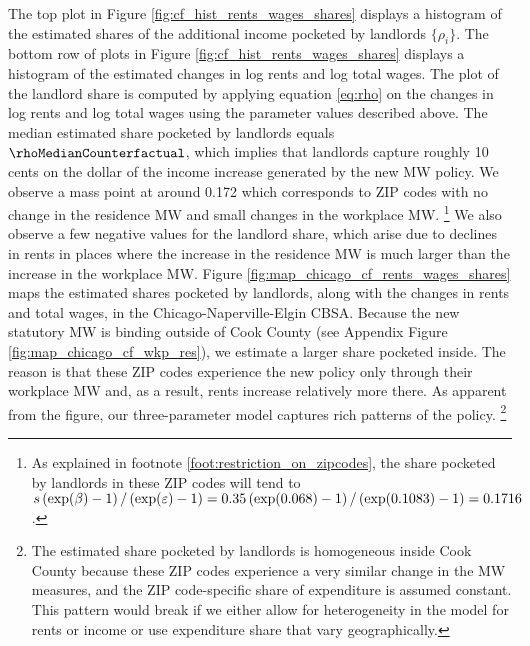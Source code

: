 The top plot in Figure \ref{fig:cf_hist_rents_wages_shares} displays a histogram 
of the estimated shares of the additional income pocketed by landlords 
$\{\rho_i\}$.
The bottom row of plots in Figure \ref{fig:cf_hist_rents_wages_shares} displays 
a histogram of the estimated changes in log rents and log total wages.
The plot of the landlord share is computed by applying equation \eqref{eq:rho} 
on the changes in log rents and log total wages using the parameter values
described above.
The median estimated share pocketed by landlords equals $\rhoMedianCounterfactual$, which implies 
that landlords capture roughly 10 cents on the dollar of the income increase 
generated by the new MW policy.
We observe a mass point at around 0.172 which corresponds to ZIP codes with
no change in the residence MW and small changes in the workplace MW.%
\footnote{As explained in footnote \ref{foot:restriction_on_zipcodes}, the 
share pocketed by landlords in these ZIP codes will tend to
$s \left(\exp(\beta)-1\right)/\left(\exp(\varepsilon)-1\right) 
= 0.35 \left(\exp(\textnormal{0.068})-1\right)/
     \left(\exp(0.1083)-1\right)
= 0.1716$.}
We also observe a few negative values for the landlord share, which
arise due to declines in rents in places where the increase in the residence MW
is much larger than the increase in the workplace MW.
Figure \ref{fig:map_chicago_cf_rents_wages_shares} maps the estimated shares 
pocketed by landlords, along with the changes in rents and total wages, in the 
Chicago-Naperville-Elgin CBSA.
Because the new statutory MW is binding outside of Cook County 
(see Appendix Figure \ref{fig:map_chicago_cf_wkp_res}), 
we estimate a larger share pocketed inside.
The reason is that these ZIP codes experience the new policy only through
their workplace MW and, as a result,
rents increase relatively more there.
As apparent from the figure, our three-parameter model captures rich patterns
of the policy.%
\footnote{The estimated share pocketed by landlords is homogeneous inside 
Cook County because these ZIP codes experience a very similar change in the 
MW measures, and the ZIP code-specific share of expenditure is assumed constant.
This pattern would break if we either allow for heterogeneity in the model for 
rents or income or use expenditure share that vary geographically.}

